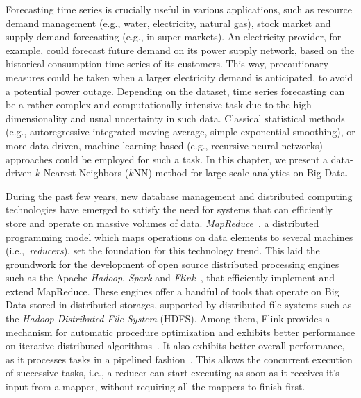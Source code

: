 
\graphicspath{{Papers/SpringerJournalOfBigData/}}

Forecasting time series is crucially useful in various applications, such as resource demand management (e.g., water, electricity, natural gas), stock market and supply demand forecasting (e.g., in super markets). An electricity provider, for example, could forecast future demand on its power supply network, based on the historical consumption time series of its customers. This way, precautionary measures could be taken when a larger electricity demand is anticipated, to avoid a potential power outage. Depending on the dataset, time series forecasting can be a rather complex and computationally intensive task due to the high dimensionality and usual uncertainty in such data. Classical statistical methods (e.g., autoregressive integrated moving average, simple exponential smoothing), or more data-driven, machine learning-based (e.g., recursive neural networks) approaches could be employed for such a task. In this chapter, we present a data-driven $k$-Nearest Neighbors ($k$NN) method for large-scale analytics on Big Data.

During the past few years, new database management and distributed computing technologies have emerged to satisfy the need for systems that can efficiently store and operate on massive volumes of data. \textit{MapReduce}~\cite{dean2008msd}, a distributed programming model which maps operations on data elements to several machines (i.e.,~\textit{reducers}), set the foundation for this technology trend. This laid the groundwork for the development of open source distributed processing engines such as the Apache \textit{Hadoop}, \textit{Spark} and \textit{Flink}~\cite{alexandrov2014stratosphere}, that efficiently implement and extend MapReduce. These engines offer a handful of tools that operate on Big Data stored in distributed storages, supported by distributed file systems such as the \textit{Hadoop Distributed File System} (HDFS). Among them, Flink provides a mechanism for automatic procedure optimization and exhibits better performance on iterative distributed algorithms~\cite{studybig2014}. It also exhibits better overall performance, as it processes tasks in a pipelined fashion~\cite{flinkPipeline}. This allows the concurrent execution of successive tasks, i.e., a reducer can start executing as soon as it receives it's input from a mapper, without requiring all the mappers to finish first.

